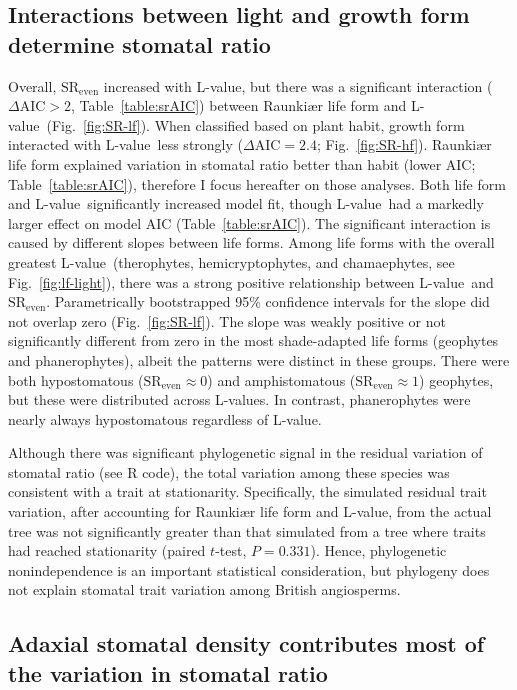 \documentclass[12pt, oneside]{article}
\newcommand{\el}{L-value}
\newcommand{\els}{L-values}
\begin{document}
\subsection*{Interactions between light and growth form determine stomatal ratio}

Overall, $\mathrm{SR_{even}}$ increased with \el, but there was a significant interaction ($\Delta\mathrm{AIC} > 2$, Table~\ref{table:srAIC}) between Raunki\ae r life form and \el~(Fig.~\ref{fig:SR-lf}). When classified based on plant habit, growth form interacted with \el~less strongly ($\Delta \textrm{AIC} = 2.4$; Fig.~\ref{fig:SR-hf}). Raunki\ae r life form explained variation in stomatal ratio better than habit (lower AIC; Table~\ref{table:srAIC}), therefore I focus hereafter on those analyses. Both life form and \el~significantly increased model fit, though \el~had a markedly larger effect on model AIC (Table~\ref{table:srAIC}). The significant interaction is caused by different slopes between life forms. Among life forms with the overall greatest \el~(therophytes, hemicryptophytes, and chamaephytes, see Fig.~\ref{fig:lf-light}), there was a strong positive relationship between \el~and $\mathrm{SR_{even}}$. Parametrically bootstrapped 95\% confidence intervals for the slope did not overlap zero (Fig.~\ref{fig:SR-lf}). The slope was weakly positive or not significantly different from zero in the most shade-adapted life forms (geophytes and phanerophytes), albeit the patterns were distinct in these groups. There were both hypostomatous ($\mathrm{SR_{even}} \approx 0$) and amphistomatous ($\mathrm{SR_{even}} \approx 1$) geophytes, but these were distributed across \els. In contrast, phanerophytes were nearly always hypostomatous regardless of \el. 

Although there was significant phylogenetic signal in the residual variation of stomatal ratio (see R code), the total variation among these species was consistent with a trait at stationarity. Specifically, the simulated residual trait variation, after accounting for Raunki\ae r life form and \el, from the actual tree was not significantly greater than that simulated from a tree where traits had reached stationarity (paired $t$-test, $P = 0.331$). Hence, phylogenetic nonindependence is an important statistical consideration, but phylogeny does not explain stomatal trait variation among British angiosperms.

\subsection*{Adaxial stomatal density contributes most of the variation in stomatal ratio}
\end{document}
